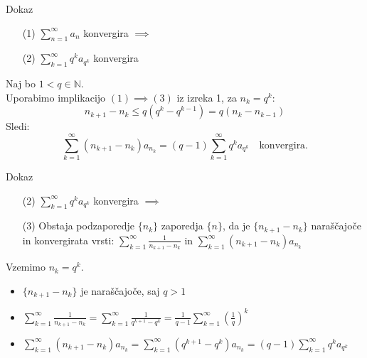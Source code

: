 \documentclass{beamer}
\begin{document}
\begin{frame}{Dokaz}
    \begin{block}{}
        \begin{enumerate}   
            \item[(1)] $\sum_{n = 1}^{\infty}{a_n}$ konvergira $\implies$
            \item[(2)] $\sum_{k = 1}^{\infty}{q^ka_{q^k}}$ konvergira
        \end{enumerate}
    \end{block}     
    
    Naj bo $ 1 < q \in {\mathbb{N}}$.\\
    Uporabimo implikacijo $(1) \implies (3)$
    iz izreka 1, za $n_k = q^k$:\\
    \[
        n_{k+1} - n_k \leq q(q^k - q^{k-1}) = q(n_{k} - n_{k - 1})
    \]
    \pause
    Sledi:
    \[
        \sum_{k = 1}^{\infty}{(n_{k+1} - n_k)a_{n_k}} = (q-1)\sum_{k = 1}^{\infty}{q^ka_{q^k}} 
        \quad \text{konvergira.}
    \]    
\end{frame}
\begin{frame}{Dokaz}
    \begin{block}{}
        \begin{enumerate} 
            \item[(2)] $\sum_{k = 1}^{\infty}{q^ka_{q^k}}$ konvergira $\implies$
            \item[(3)] Obstaja podzaporedje $\{n_k\}$ zaporedja $\{n\}$, da je $\{n_{k+1} - n_k\}$ 
            naraščajoče in konvergirata vrsti:
            $\sum_{k = 1}^{\infty}{\frac{1}{n_{k+1} - n_k}}$ in 
            $\sum_{k = 1}^{\infty}{(n_{k+1} - n_k)a_{n_k}}$
        \end{enumerate}
    \end{block}     
    
    Vzemimo ${n_k} = q^k$.
    \pause 
    \begin{itemize}
        \item $\{n_{k+1} - n_k\}$ je naraščajoče, saj $ q > 1$
        \pause
        \item 
        $\sum_{k = 1}^{\infty}{\frac{1}{n_{k+1} - n_k}} = 
        \sum_{k = 1}^{\infty}{\frac{1}{q^{k + 1} - q^k}} =
        \frac{1}{q - 1}\sum_{k = 1}^{\infty}{(\frac{1}{q})^k}$
        \pause
        \item 
        $\sum_{k = 1}^{\infty}{(n_{k+1} - n_k)a_{n_k}} =
        \sum_{k = 1}^{\infty}{(q^{k + 1} - q^k)}a_{n_k} =
        (q - 1)\sum_{k = 1}^{\infty}{q^ka_{q^k}}$        
    \end{itemize}
    
\end{frame}
\end{document}
